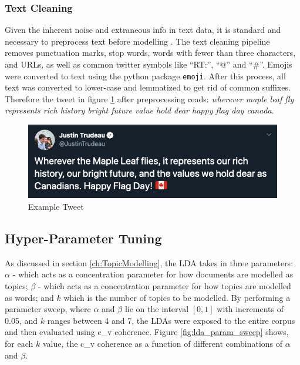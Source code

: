 \subsubsection{Text Cleaning}

Given the inherent noise and extraneous info in text data, it is standard and
necessary to preprocess text before modelling \cite{sapul2017trending}. The text
cleaning pipeline removes punctuation marks, stop words, words with fewer than
three characters, and URLs, as well as common twitter symbols like ``RT:'',
``@'' and ``\#''. Emojis were converted to text using the python package
\texttt{emoji}. After this process, all text was converted to lower-case and
lemmatized to get rid of common suffixes. Therefore the tweet in figure
\ref{fig:tweet_ex} after preprocessing reads: \emph{wherever maple leaf fly
represents rich history bright future value hold dear happy flag day canada}.

\begin{singlespacing}
    \begin{figure}[H]
    \centering
    \includegraphics[scale=0.55]{Figures/tweet_ex}
    \caption[Example Tweet]{Example Tweet}
    \label{fig:tweet_ex}
    \end{figure}
\end{singlespacing}

\subsection{Hyper-Parameter Tuning}\label{sec:TopicModellingHP}

As discussed in section \ref{ch:TopicModelling}, the LDA takes in three
parameters: $\alpha$ - which acts as a concentration parameter for how documents
are modelled as topics; $\beta$ - which acts as a concentration parameter for
how topics are modelled as words; and $k$ which is the number of topics to be
modelled. By performing a parameter sweep, where $\alpha$ and $\beta$ lie on the
interval $\left[0,1\right]$ with increments of 0.05, and $k$ ranges between 4
and 7, the LDAs were exposed to the entire corpus and then evaluated using c\_v
coherence. Figure \ref{fig:lda_param_sweep} shows, for each $k$ value, the c\_v
coherence as a function of different combinations of $\alpha$ and $\beta$.

